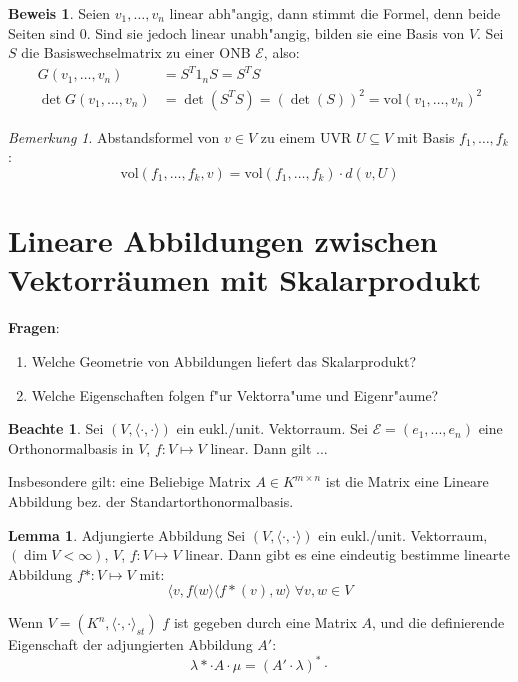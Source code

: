 \documentclass[oneside,fontsize=11pt,paper=a4,BCOR=0mm,DIV=12,automark,headsepline]{scrbook}
\theoremstyle{remark}
\theoremstyle{definition}
\newtheorem*{notte}{Beachte}
\newtheorem{lemma}{Lemma}[section]
\theoremstyle{definition}
\newtheorem*{prof}{Beweis}
\theoremstyle{remark}
\newtheorem*{bem}{Bemerkung}
\begin{document}
\begin{prof}
  Seien \(v_1,\dots,v_n\) linear abh"angig, dann stimmt die Formel, denn beide Seiten sind 0. Sind sie jedoch linear unabh"angig, bilden sie eine Basis von \(V\). Sei \(S\) die Basiswechselmatrix zu einer ONB \(\mathcal{E}\), also:
  \begin{align*}
    G(v_1,\dots,v_n) &= S^T1_nS = S^TS \\
    \det G(v_1,\dots,v_n) &= \det (S^TS) = \left(\det (S)\right)^2 = \text{vol}(v_1,\dots,v_n)^2
  \end{align*}
\end{prof}
\begin{bem}
  Abstandsformel von \(v\in V\) zu einem UVR \(U\subseteq V\) mit Basis \(f_1,\dots, f_k\):
  \[\text{vol}(f_1,\dots,f_k,v) = \text{vol}(f_1,\dots,f_k)\cdot d(v,U)\]
\end{bem}
\section{Lineare Abbildungen zwischen Vektorräumen mit Skalarprodukt }
\label{sec:vsk}
\textbf{Fragen}:
\begin{enumerate}
\item Welche Geometrie von Abbildungen liefert das Skalarprodukt?
\item Welche Eigenschaften folgen f"ur Vektorra"ume und Eigenr"aume?
\end{enumerate}

\begin{notte}
  Sei $(V, \langle {\cdot, \cdot} \rangle)$ ein eukl./unit. Vektorraum. Sei
  $\mathcal{E}=(e_1,...,e_n)$ eine Orthonormalbasis in $V$, $f: V\mapsto V $
  linear. Dann gilt ...

  Insbesondere gilt: eine Beliebige Matrix $A\in K^{m\times n}$ ist die Matrix
  eine Lineare Abbildung bez. der Standartorthonormalbasis.
\end{notte}

\begin{lemma}{Adjungierte Abbildung}
  Sei $(V, \langle {\cdot, \cdot} \rangle)$ ein eukl./unit. Vektorraum, $(\dim V
  < \infty)$, $V$, $f: V\mapsto V $ linear. Dann gibt es eine eindeutig bestimme
  linearte Abbildung $f*: V\mapsto V $ mit: \[
    \langle {v, f(w} \rangle \langle {f*(v), w} \rangle\; \forall v, w \in V
  \]
\end{lemma}

\begin{exa}
  Wenn $V=(K^n, \langle {\cdot, \cdot} \rangle _{st})$ $f$ ist gegeben durch
  eine Matrix $A$, und die definierende Eigenschaft der adjungierten Abbildung
  $A'$:
  \[ \lambda*\cdot A \cdot \mu = (A'\cdot \lambda)^*\cdot\]
\end{exa}
\end{document}
